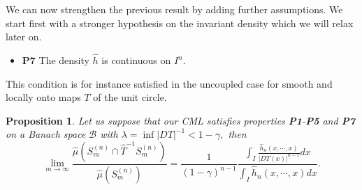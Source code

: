 \documentclass[12pt,reqno,a4paper]{amsart}
\newtheorem{prop}[thm]{Proposition}
\begin{document}
We can now strengthen the previous result by adding  further assumptions.  We start first with a stronger  hypothesis on the invariant density which we will relax later on.
\begin{itemize}
\item {\bf P7} The density $\hat{h}$ is continuous on $I^n.$
\end{itemize}
This condition is for instance satisfied in the uncoupled case for smooth and locally onto maps $T$ of the unit circle.
\begin{prop}\label{propp}
Let us suppose that our CML satisfies properties {\bf P1}-{\bf P5} and {\bf P7} on a Banach space $\mathcal{B}$ with $\lambda=\inf|DT|^{-1}<1-\gamma,$  then
$$ \lim_{m\rightarrow \infty}\frac{\hat{\mu}(S^{(n)}_m\cap \hat{T}^{-1} S^{(n)}_m)}{\hat{\mu}(S^{(n)}_m)}=\frac{1}{(1-\gamma)^{n-1}}\frac{\int_I \frac{\hat{h}_n(x,\cdots, x)}{|DT(x)|^{n-1}}dx }{\int_I \hat{h}_n(x,\cdots,x)dx}.
$$
\end{prop}
\end{document}
